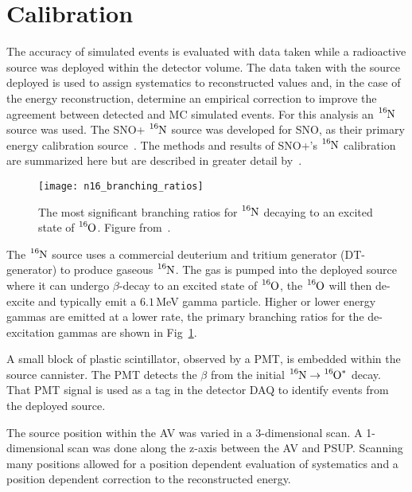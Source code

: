 \section{Calibration}
\label{sec:calib}
The accuracy of simulated events is evaluated with data taken while a
radioactive source was deployed within the detector volume.
The data taken with the source deployed is used to assign systematics to reconstructed
values and, in the case of the energy reconstruction, determine an empirical
correction to improve the agreement between detected and MC simulated events.
For this analysis an $\ce{^{16}N}$ source was used.
The SNO+ $\ce{^{16}N}$ source was developed for SNO, as
their primary energy calibration source~\citep{sno_n16}.
The methods and results of SNO+'s $\ce{^{16}N}$ calibration are summarized here but
are described in greater detail by~\citep{snop_water_unidoc}.

\begin{figure}[htbp]
\centering
\texttt{[image: n16\_branching\_ratios]}
\caption[Major $\ce{^{16}N}$ Branching Ratios]{The most significant branching ratios for $\ce{^{16}N}$ decaying
to an excited state of $\ce{^{16}O}$. Figure from~\citep{sno_n16}.}
\label{fig:n16_br}
\end{figure}
The $\ce{^{16}N}$ source uses a commercial
deuterium and tritium generator (DT-generator) to produce gaseous $\ce{^{16}N}$.
The gas is pumped into the deployed source where it can undergo $\beta$-decay
to an excited state of $\ce{^{16}O}$, the $\ce{^{16}O}$ will then de-excite
and typically emit a $6.1$\,MeV gamma particle. Higher or lower energy gammas are emitted
at a lower rate, the primary branching ratios for the de-excitation gammas are shown in
Fig~\ref{fig:n16_br}.

A small block of plastic scintillator, observed by a PMT, is embedded within the
source cannister. The PMT detects the $\beta$ from the initial
$\ce{^{16}N} \rightarrow \ce{^{16}O^{*}}$ decay. That PMT signal is used as a
tag in the detector DAQ to identify events from the deployed source.

The source position within the AV was varied in a 3-dimensional
scan.
A 1-dimensional scan was done along the z-axis between the AV and PSUP\@.
Scanning many positions allowed for a position dependent evaluation of
systematics and a position dependent correction to the reconstructed energy.

